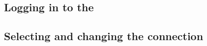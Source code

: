 \subsection{Logging in to the \gddb{}}
\label{tasksdblogin}


\subsection{Selecting and changing the \gddb{} connection}



